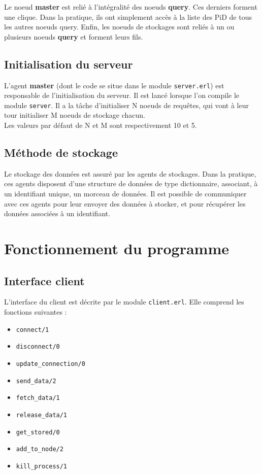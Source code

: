 \documentclass[a4paper]{article}
\begin{document}
Le noeud \textbf{master} est relié à l'intégralité des noeuds \textbf{query}. Ces derniers
forment une clique. Dans la pratique, ils ont simplement accès à la liste des PiD de tous les autres noeuds query.
Enfin, les noeuds de stockages sont reliés à un ou plusieurs noeuds \textbf{query} et forment leurs fils.

\subsection{Initialisation du serveur}

L'agent \textbf{master} (dont le code se situe dans le module \texttt{server.erl}) est responsable de l'initialisation du serveur. Il est lancé lorsque l'on
compile le module \texttt{server}. Il a la tâche d'initialiser N noeuds de requêtes, qui vont à leur tour initialiser M noeuds de stockage chacun. \\
Les valeurs par défaut de N et M sont respectivement 10 et 5.

\subsection{Méthode de stockage}
Le stockage des données est assuré par les agents de stockages. Dans la pratique,
ces agents disposent d'une structure de données de type dictionnaire, associant,
à un identifiant unique, un morceau de données. Il est possible de communiquer avec
ces agents pour leur envoyer des données à stocker, et pour récupérer les données associées à un identifiant.

\section{Fonctionnement du programme}
\label{sec:fonctionnement}

\subsection{Interface client}

L'interface du client est décrite par le module \texttt{client.erl}. Elle comprend les fonctions suivantes :
\begin{multicols}{2}
\begin{itemize}
    \item \texttt{connect/1}
    \item \texttt{disconnect/0}
    \item \texttt{update\_connection/0}
    \item \texttt{send\_data/2}
    \item \texttt{fetch\_data/1}
    \item \texttt{release\_data/1}
    \item \texttt{get\_stored/0}
    \item \texttt{add\_to\_node/2}
    \item \texttt{kill\_process/1}
\end{itemize}
\end{multicols}
\end{document}

